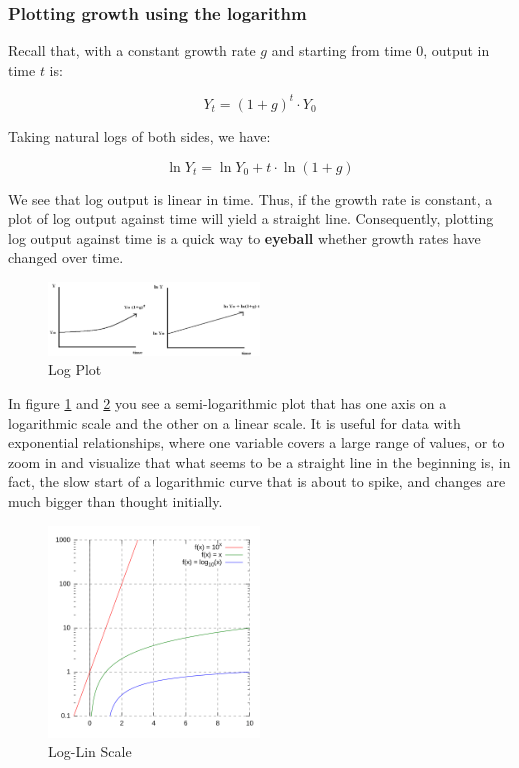 \documentclass[
  12pt,
  oneside]{book}
\theoremstyle{definition}
\theoremstyle{definition}
\theoremstyle{definition}
\theoremstyle{definition}
\theoremstyle{remark}
\begin{document}
\hypertarget{plotting-growth-using-the-logarithm}{%
\subsubsection*{Plotting growth using the logarithm}\label{plotting-growth-using-the-logarithm}}

Recall that, with a constant growth rate \(g\) and starting from time 0, output in time \(t\) is:

\[Y_t = (1 + g)^t \cdot Y_0\]

Taking natural logs of both sides, we have:

\[\ln Y_t = \ln Y_0 + t \cdot \ln (1 + g)\]

We see that log output is linear in time. Thus, if the growth rate is constant, a plot of log output against time will yield a straight line. Consequently, plotting log output against time is a quick way to \textbf{eyeball} whether growth rates have changed over time.

\begin{figure}
\centering
\includegraphics[width=0.5\textwidth,height=\textheight]{fig/logplot.png}
\caption{\label{fig:logplot} Log Plot}
\end{figure}

In figure \ref{fig:logplot} and \ref{fig:loginscale} you see a semi-logarithmic plot that has one axis on a logarithmic scale and the other on a linear scale. It is useful for data with exponential relationships, where one variable covers a large range of values, or to zoom in and visualize that what seems to be a straight line in the beginning is, in fact, the slow start of a logarithmic curve that is about to spike, and changes are much bigger than thought initially.

\begin{figure}
\centering
\includegraphics[width=0.5\textwidth,height=\textheight]{fig/LogLinScale.png}
\caption{\label{fig:loginscale} Log-Lin Scale}
\end{figure}
\end{document}

